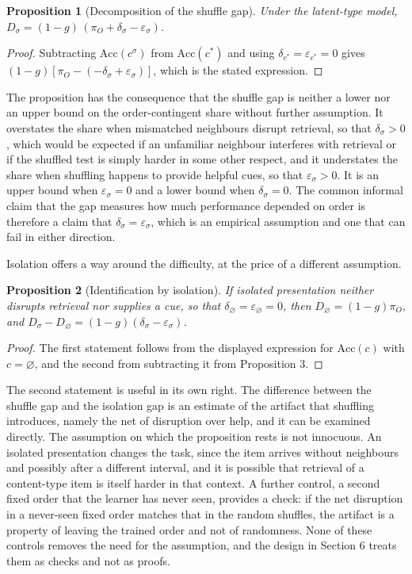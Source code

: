 \documentclass[11pt]{article}
\newtheorem{proposition}{Proposition}
\theoremstyle{remark}
\begin{document}
\begin{proposition}[Decomposition of the shuffle gap]
Under the latent-type model, $D_\sigma = (1-g)\,(\pi_O + \delta_\sigma - \varepsilon_\sigma)$.
\end{proposition}

\begin{proof}
Subtracting $\mathrm{Acc}(c^\sigma)$ from $\mathrm{Acc}(c^\ast)$ and using $\delta_{c^\ast}=\varepsilon_{c^\ast}=0$ gives $(1-g)[\pi_O - (-\delta_\sigma+\varepsilon_\sigma)]$, which is the stated expression.
\end{proof}

The proposition has the consequence that the shuffle gap is neither a lower nor an upper bound on the order-contingent share without further assumption. It overstates the share when mismatched neighbours disrupt retrieval, so that $\delta_\sigma>0$, which would be expected if an unfamiliar neighbour interferes with retrieval or if the shuffled test is simply harder in some other respect, and it understates the share when shuffling happens to provide helpful cues, so that $\varepsilon_\sigma>0$. It is an upper bound when $\varepsilon_\sigma=0$ and a lower bound when $\delta_\sigma=0$. The common informal claim that the gap measures how much performance depended on order is therefore a claim that $\delta_\sigma=\varepsilon_\sigma$, which is an empirical assumption and one that can fail in either direction.

Isolation offers a way around the difficulty, at the price of a different assumption.

\begin{proposition}[Identification by isolation]
If isolated presentation neither disrupts retrieval nor supplies a cue, so that $\delta_\varnothing=\varepsilon_\varnothing=0$, then $D_\varnothing = (1-g)\pi_O$, and $D_\sigma - D_\varnothing = (1-g)(\delta_\sigma-\varepsilon_\sigma)$.
\end{proposition}

\begin{proof}
The first statement follows from the displayed expression for $\mathrm{Acc}(c)$ with $c=\varnothing$, and the second from subtracting it from Proposition 3.
\end{proof}

The second statement is useful in its own right. The difference between the shuffle gap and the isolation gap is an estimate of the artifact that shuffling introduces, namely the net of disruption over help, and it can be examined directly. The assumption on which the proposition rests is not innocuous. An isolated presentation changes the task, since the item arrives without neighbours and possibly after a different interval, and it is possible that retrieval of a content-type item is itself harder in that context. A further control, a second fixed order that the learner has never seen, provides a check: if the net disruption in a never-seen fixed order matches that in the random shuffles, the artifact is a property of leaving the trained order and not of randomness. None of these controls removes the need for the assumption, and the design in Section 6 treats them as checks and not as proofs.
\end{document}
